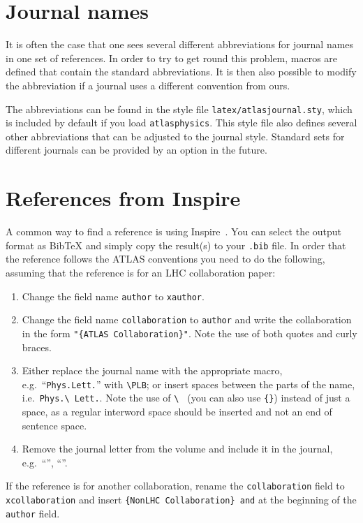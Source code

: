 \documentclass[UKenglish]{latex/atlasdoc}
\newcommand{\File}[1]{\texttt{#1}\xspace}
\newcommand{\Package}[1]{\texttt{#1}\xspace}
\begin{document}
\section{Journal names}

It is often the case that one sees several different abbreviations for journal
names in one set of references.
In order to try to get round this problem, macros are defined that
contain the standard abbreviations.
It is then also possible to modify the abbreviation if a journal uses a different convention from ours.

The abbreviations can be found in the style file \File{latex/atlasjournal.sty},
which is included by default if you load \Package{atlasphysics}.
This style file also defines several other abbreviations that can be adjusted to the
journal style. 
Standard sets for different journals can be provided by an option in the future.


\section{References from Inspire}
\label{sc:inquire}

A common way to find a reference is using Inspire~\cite{inspire}.
You can select the output format as BibTeX and simply copy the result(s) to your \File{.bib} file.
In order that the reference follows the ATLAS conventions you need to do the following,
assuming that the reference is for an LHC collaboration paper:
\begin{enumerate}
\item Change the field name \texttt{author} to \texttt{xauthor}.
\item Change the field name \texttt{collaboration} to \texttt{author} and write the collaboration in the form
  \verb|"{ATLAS Collaboration}"|. Note the use of both quotes and curly braces.
\item Either replace the journal name with the appropriate macro, e.g.\ ``\texttt{Phys.Lett.}'' with
  \verb|\PLB|; or insert spaces between the parts of the name, i.e.\ \verb|Phys.\ Lett.|.
  Note the use of \verb|\ | (you can also use \verb|{}|) instead of just a space, 
  as a regular interword space should be inserted and not an end of sentence space.
\item Remove the journal letter from the volume and include it in the journal, e.g.\ ``\EPJC'', ``\PRD''. 
\end{enumerate}
If the reference is for another collaboration, rename the \texttt{collaboration} field to
\texttt{xcollaboration} and insert \verb|{NonLHC Collaboration} and| at the beginning of the 
\texttt{author} field.
\end{document}
